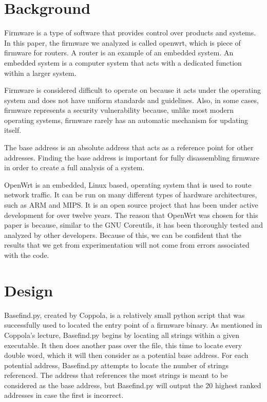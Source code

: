 \documentclass[letterpaper,twocolumn,10pt]{article}
\begin{document}
\section{Background}
Firmware is a type of software that provides control over products and systems. In this paper, the firmware we analyzed is called openwrt, which is piece of firmware for routers. A router is an example of an embedded system. An embedded system is a computer system that acts with a dedicated function within a larger system.               

Firmware is considered difficult to operate on because it acts under the operating system and does not have uniform standards and guidelines. Also, in some cases, firmware represents a security vulnerability because, unlike most modern operating systems, firmware rarely has an automatic mechanism for updating itself\cite{firmwaresecurity2014}. 

The base address is an absolute address that acts as a reference point for other addresses. Finding the base address is important for fully disassembling firmware in order to create a full analysis of a system. 

OpenWrt is an embedded, Linux based, operating system that is used to route network traffic. It can be run on many different types of hardware architectures, such as ARM and MIPS. It is an open source project that has been under active development for over twelve years. The reason that OpenWrt was chosen for this paper is because, similar to the GNU Coreutils, it has been thoroughly tested and analyzed by other developers. Because of this, we can be confident that the results that we get from experimentation will not come from errors associated with the code. 

\section{Design}
Basefind.py, created by Coppola\cite{cloudscale2013}, is a relatively small python script that was successfully used to located the entry point of a firmware binary. As mentioned in Coppola's lecture, Basefind.py begins by locating all strings within a given executable. It then does another pass over the file, this time to locate every double word, which it will then consider as a potential base address. For each potential address, Basefind.py attempts to locate the number of strings referenced. The address that references the most strings is meant to be considered as the base address, but Basefind.py will output the 20 highest ranked addresses in case the first is incorrect. 
\end{document}
